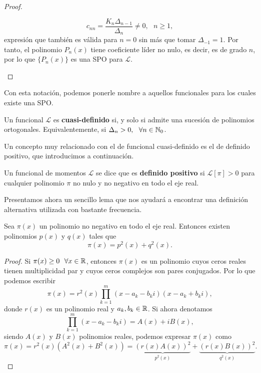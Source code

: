 \begin{proof}
\begin{itemize}
        \begin{equation}
            \label{eq:cnn}
            c_{nn} = \dfrac{K_n \Delta_{n-1}}{\Delta_n} \neq 0, \ \ \ n\geq 1,
        \end{equation}
        expresión que también es válida para $n=0$ sin más que tomar $\Delta_{-1}=1$. Por tanto, el polinomio $P_n(x)$ tiene coeficiente líder no nulo, es decir, es de grado $n$, por lo que $\{P_n(x)\}$ es una SPO para $\mathcal L$. 
    \end{itemize}

\end{proof}

Con esta notación, podemos ponerle nombre a aquellos funcionales para los cuales existe una SPO.

\begin{definicion}
    Un funcional $\mathcal L$ es \textbf{cuasi-definido} si, y solo si admite una sucesión de polinomios ortogonales. Equivalentemente, si $\Delta_n > 0, \ \ \forall n\in \mathbb{N}_0$.
    
\end{definicion}

Un concepto muy relacionado con el de funcional cuasi-definido es el de definido positivo, que introducimos a continuación.

\begin{definicion}

    Un funcional de momentos $\mathcal{L}$ se dice que es \textbf{definido positivo} si $\mathcal{L}[\pi] > 0$ para cualquier polinomio $\pi$ no nulo y no negativo en todo el eje real.
    
\end{definicion}

Presentamos ahora un sencillo lema que nos ayudará a encontrar una definición alternativa utilizada con bastante frecuencia. 

\begin{lema}
Sea $\pi(x)$ un polinomio no negativo en todo el eje real. Entonces existen polinomios $p(x)$ y $q(x)$ tales que 
$$
\pi(x) = p^2(x) + q^2(x).
$$
\end{lema}
\begin{proof}
    Si $\pi(x) \geq 0 \ \ \forall x\in\R$, entonces $\pi(x)$ es un polinomio cuyos ceros reales tienen multiplicidad par y cuyos ceros complejos son pares conjugados. Por lo que podemos escribir
    $$
    \pi(x) = r^2(x) \prod_{k=1}^m(x-a_k-b_k i)(x-a_k+b_k i),
    $$
    donde $r(x)$ es un polinomio real y $a_k,b_k\in\mathbb{R}$. Si ahora denotamos
    $$
    \prod_{k=1}^m(x-a_k-b_k i) = A(x) + i B(x),
    $$
    siendo $A(x)$ y $B(x)$ polinomios reales, podemos expresar $\pi(x)$ como
    $$
    \pi(x) = r^2(x)(A^2(x) + B^2(x)) = \underbrace{(r(x)A(x))^2}_{p^2(x)} + \underbrace{(r(x)B(x))^2}_{q^2(x)}.
    $$
\end{proof}

